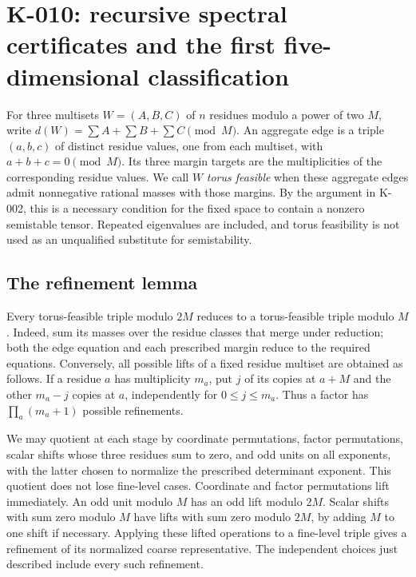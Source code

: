 \section{K-010: recursive spectral certificates and the first five-dimensional classification}

For three multisets $W=(A,B,C)$ of $n$ residues modulo a power of two $M$,
write $d(W)=\sum A+\sum B+\sum C\pmod M$.  An aggregate edge is a triple
$(a,b,c)$ of distinct residue values, one from each multiset, with
$a+b+c=0\pmod M$.  Its three margin targets are the multiplicities of the
corresponding residue values.  We call $W$ \emph{torus feasible} when these
aggregate edges admit nonnegative rational masses with those margins.
By the argument in K-002, this is a necessary condition for the fixed
space to contain a nonzero semistable tensor.  Repeated eigenvalues are
included, and torus feasibility is not used as an unqualified substitute
for semistability.

\subsection*{The refinement lemma}
Every torus-feasible triple modulo $2M$ reduces to a torus-feasible triple
modulo $M$.  Indeed, sum its masses over the residue classes that merge
under reduction; both the edge equation and each prescribed margin
reduce to the required equations.  Conversely, all possible lifts of a
fixed residue multiset are obtained as follows.  If a residue $a$ has
multiplicity $m_a$, put $j$ of its copies at $a+M$ and the other $m_a-j$
copies at $a$, independently for $0\le j\le m_a$.  Thus a factor has
$\prod_a(m_a+1)$ possible refinements.

We may quotient at each stage by coordinate permutations, factor
permutations, scalar shifts whose three residues sum to zero, and odd
units on all exponents, with the latter chosen to normalize the prescribed
determinant exponent.  This quotient does not lose fine-level cases.
Coordinate and factor permutations lift immediately.  An odd unit modulo
$M$ has an odd lift modulo $2M$.  Scalar shifts with sum zero modulo $M$
have lifts with sum zero modulo $2M$, by adding $M$ to one shift if
necessary.  Applying these lifted operations to a fine-level triple gives
a refinement of its normalized coarse representative.  The independent
choices just described include every such refinement.

